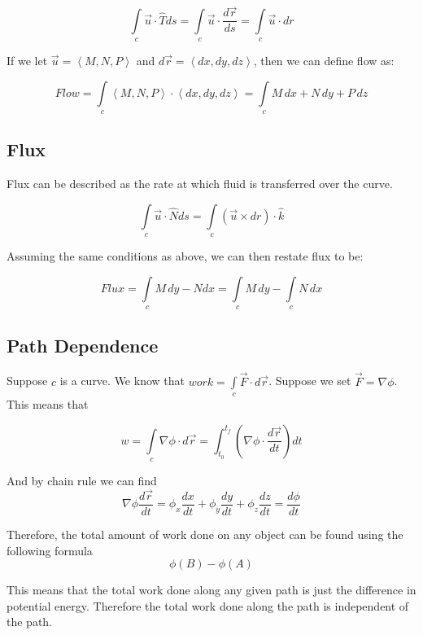 \documentclass{article}
\newcommand{\nvec}[1]{\left\langle #1 \right\rangle}
\begin{document}
    \begin{equation}
    \int\limits_c \vec{u} \cdot \hat{T} ds = \int\limits_c \vec{u} \cdot \frac{d\vec{r} }{ds} = \int\limits_c \vec{u} \cdot dr
    \end{equation}

    If we let $ \vec{u} = \nvec{M, N, P} $ and $ d\vec{r} = \nvec{dx, dy, dz} $, then we can define flow as:

    \begin{equation}
    Flow = \int\limits_c \nvec{M, N, P} \cdot \nvec{dx, dy, dz} = \int\limits_c M \, dx + N \, dy + P \, dz
    \end{equation}

    \subsection{Flux}
    Flux can be described as the rate at which fluid is transferred over the curve.

    \begin{equation}
    \int\limits_c \vec{u} \cdot \hat{N} ds = \int\limits_c \left( \vec{u} \times dr \right) \cdot \hat{k}
    \end{equation}

    Assuming the same conditions as above, we can then restate flux to be:

    \begin{equation}
    Flux = \int\limits_c M \, dy - Ndx = \int\limits_c M \, dy - \int\limits_c N \, dx
    \end{equation}

    \subsection{Path Dependence}
    Suppose $c$ is a curve. We know that $work=\int\limits_c\vec{F}\cdot d\vec{r}$. Suppose we set $\vec{F}=\nabla\phi$. This means that

    \[
    w=\int\limits_c\nabla\phi\cdot d\vec{r} = \int_{t_0}^{t_f} (\nabla\phi \cdot \frac{d\vec{r} }{dt})dt
    \]

    And by chain rule we can find
    \[
    \nabla \phi \frac{d\vec{r} }{dt} = \phi_x \frac{dx}{dt} + \phi_y \frac{dy}{dt} + \phi_z \frac{dz}{dt} = \frac{d\phi}{dt}
    \]

    Therefore, the total amount of work done on any object can be found using the following formula
    \[
    \phi (B) - \phi (A)
    \]

    This means that the total work done along any given path is just the difference in potential energy. Therefore the total work done along the path is independent of the path.
\end{document}
